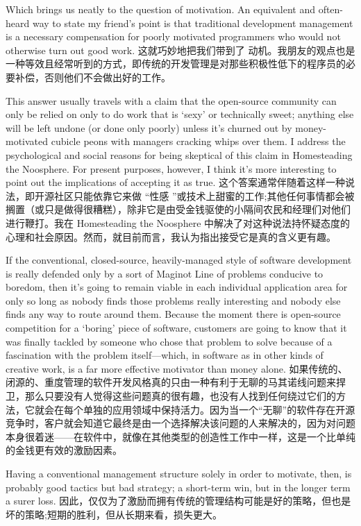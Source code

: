 \documentclass[a4paper,12pt,UTF8,twoside]{ctexbook}
\begin{document}
Which brings us neatly to the question of motivation. An equivalent and often-heard way to state my friend's point is that traditional development management is a necessary compensation for poorly motivated programmers who would not otherwise turn out good work.
这就巧妙地把我们带到了 动机。我朋友的观点也是一种等效且经常听到的方式，即传统的开发管理是对那些积极性低下的程序员的必要补偿，否则他们不会做出好的工作。

This answer usually travels with a claim that the open-source community can only be relied on only to do work that is `sexy' or technically sweet; anything else will be left undone (or done only poorly) unless it's churned out by money-motivated cubicle peons with managers cracking whips over them. I address the psychological and social reasons for being skeptical of this claim in Homesteading the Noosphere. For present purposes, however, I think it's more interesting to point out the implications of accepting it as true.
这个答案通常伴随着这样一种说法，即开源社区只能依靠它来做 “性感 ”或技术上甜蜜的工作;其他任何事情都会被搁置（或只是做得很糟糕），除非它是由受金钱驱使的小隔间农民和经理们对他们进行鞭打。我在 Homesteading the Noosphere 中解决了对这种说法持怀疑态度的心理和社会原因。然而，就目前而言，我认为指出接受它是真的含义更有趣。

If the conventional, closed-source, heavily-managed style of software development is really defended only by a sort of Maginot Line of problems conducive to boredom, then it's going to remain viable in each individual application area for only so long as nobody finds those problems really interesting and nobody else finds any way to route around them. Because the moment there is open-source competition for a `boring' piece of software, customers are going to know that it was finally tackled by someone who chose that problem to solve because of a fascination with the problem itself—which, in software as in other kinds of creative work, is a far more effective motivator than money alone.
如果传统的、闭源的、重度管理的软件开发风格真的只由一种有利于无聊的马其诺线问题来捍卫，那么只要没有人觉得这些问题真的很有趣，也没有人找到任何绕过它们的方法，它就会在每个单独的应用领域中保持活力。因为当一个“无聊”的软件存在开源竞争时，客户就会知道它最终是由一个选择解决该问题的人来解决的，因为对问题本身很着迷——在软件中，就像在其他类型的创造性工作中一样，这是一个比单纯的金钱更有效的激励因素。

Having a conventional management structure solely in order to motivate, then, is probably good tactics but bad strategy; a short-term win, but in the longer term a surer loss.
因此，仅仅为了激励而拥有传统的管理结构可能是好的策略，但也是坏的策略;短期的胜利，但从长期来看，损失更大。
\end{document}
